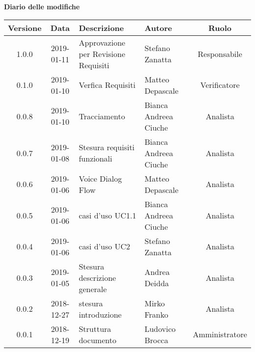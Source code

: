 	\begin{center}
		\textbf{Diario delle modifiche}
	\end{center}
	\begin{center}
		\begin{tabularx}{\textwidth}{|c|c|X|X|c|}
			\hline
			\textbf{Versione} & \textbf{Data} & \textbf{Descrizione} & \textbf{Autore} & \textbf{Ruolo} \\
			\hline
			1.0.0 & 2019-01-11 & Approvazione per Revisione Requisiti& Stefano Zanatta & Responsabile\\
			\hline
			0.1.0 & 2019-01-10 & Verfica Requisiti& Matteo Depascale & Verificatore\\
			\hline
			0.0.8 & 2019-01-10 &Tracciamento& Bianca Andreea Ciuche& Analista\\
			\hline
			0.0.7 & 2019-01-08 &Stesura requisiti funzionali& Bianca Andreea Ciuche& Analista\\
			\hline
			0.0.6 & 2019-01-06 & Voice Dialog Flow & Matteo Depascale & Analista\\
			\hline
			0.0.5 & 2019-01-06 & casi d'uso UC1.1& Bianca Andreea Ciuche & Analista\\
			\hline
			0.0.4 & 2019-01-06 & casi d'uso UC2& Stefano Zanatta & Analista\\
			\hline
			0.0.3 & 2019-01-05 & Stesura descrizione generale& Andrea Deidda & Analista\\
			\hline
			0.0.2 & 2018-12-27 & stesura introduzione & Mirko Franko & Analista\\
			\hline
			0.0.1 & 2018-12-19 & Struttura documento & Ludovico Brocca & Amministratore\\
			\hline
		\end{tabularx}
	\end{center}
\newpage
